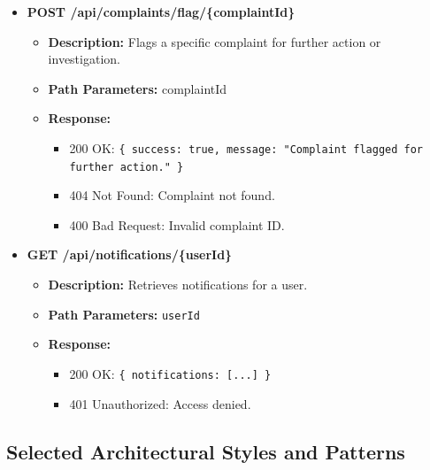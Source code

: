 \begin{itemize}
    \item \textbf{POST /api/complaints/flag/\{complaintId\}}  
    \begin{itemize}
        \item \textbf{Description:} Flags a specific complaint for further action or investigation.
        \item \textbf{Path Parameters:} complaintId  
        \item \textbf{Response:}
        \begin{itemize}
            \item 200 OK: \texttt{\{ success: true, message: "Complaint flagged for further action." \}}
            \item 404 Not Found: Complaint not found.
            \item 400 Bad Request: Invalid complaint ID.
        \end{itemize}
    \end{itemize}

    \item \textbf{GET /api/notifications/\{userId\}}  
    \begin{itemize}
        \item \textbf{Description:} Retrieves notifications for a user.
        \item \textbf{Path Parameters:} \texttt{userId}
        \item \textbf{Response:}
        \begin{itemize}
            \item 200 OK: \texttt{\{ notifications: [...] \}}
            \item 401 Unauthorized: Access denied.
        \end{itemize}
    \end{itemize}

\end{itemize}
\subsection{Selected Architectural Styles and Patterns}

